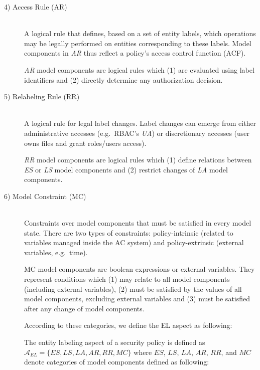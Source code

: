 \documentclass[twoside, openright, 12pt]{book}
\begin{document}
\begin{description}
\item[4) Access Rule (AR)]\hfill \\
A logical rule that defines, based on a set of entity labels, which operations may be legally performed on entities corresponding to these labels. Model components in \textit{AR} thus reflect a policy’s access control function (ACF).
\vspace{-2mm}

\begin{xdefinition}[AR] 
\textit{AR} model components are logical rules which (1) are evaluated using label identifiers and (2) directly determine any authorization decision.
\label{definition:AR}
\end{xdefinition}



\item[5) Relabeling Rule (RR)]\hfill \\
A logical rule for legal label changes.
Label changes can emerge from either administrative accesses (e.g.~RBAC's \textit{UA}) or discretionary accesses (user owns files and grant roles/users access).
\vspace{-2mm}

\begin{xdefinition}[RR] 
\textit{RR} model components are logical rules which (1) define relations between \textit{ES} or \textit{LS} model components and (2) restrict changes of \textit{LA} model components.
\label{definition:RR}
\end{xdefinition}



\item[6) Model Constraint (MC)]\hfill \\
Constraints over model components that must be satisfied in every model state.
There are two types of constraints: policy-intrinsic (related to variables managed inside the AC system) and policy-extrinsic (external variables, e.g.~time).

\begin{xdefinition}[MC] 
MC model components are boolean expressions or external variables. 
They represent conditions which (1) may relate to all model components (including external variables), (2) must be satisfied by the values of all model components, excluding external variables and (3) must be satisfied after any change of model components.
\label{definition:MC}
\end{xdefinition}

\noindent
According to these categories, we define the EL aspect as following:

\begin{xdefinition} 
The entity labeling aspect of a security policy is defined as 
$\mathcal{A}_{EL} = \lbrace ES,LS,LA,AR,RR,MC\rbrace $
where $ES$, $LS$, $LA$, $AR$, $RR$, and $MC$ denote categories of model components defined as following:
\end{xdefinition}
\end{description}
\end{document}
